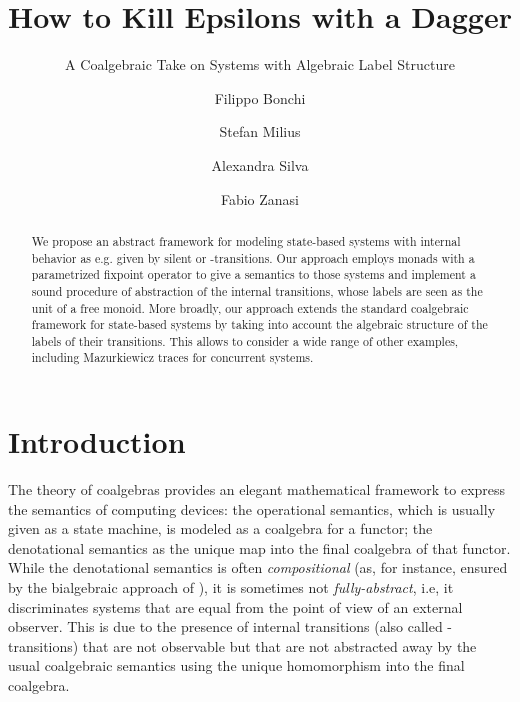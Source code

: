 \documentclass[oribibl,envcountsame,envcountsect,runningheads]{llncs}
\renewcommand{\>}{\rangle}
\begin{document}
\title{How to Kill Epsilons with a Dagger}
\subtitle{A Coalgebraic Take on Systems with Algebraic Label Structure}

\author{Filippo Bonchi \and Stefan Milius \and Alexandra Silva \and Fabio Zanasi }


\maketitle

\begin{abstract}
We propose an abstract framework for modeling state-based systems with internal behavior as e.g. given by silent or -transitions. Our approach employs monads with a parametrized fixpoint operator  to give a semantics to those systems and implement a sound procedure of abstraction of the internal transitions, whose labels are seen as the unit of a free monoid. More broadly, our approach extends the standard coalgebraic framework for state-based systems by taking into account the algebraic structure of the labels of their transitions. This allows to consider a wide range of other examples, including Mazurkiewicz traces for concurrent systems.
\end{abstract}

\section{Introduction}\label{Sec:Intro}
The theory of coalgebras provides an elegant mathematical framework to express the semantics of computing devices:
the operational semantics, which is usually given as a state machine, is modeled as a coalgebra for a functor; the denotational semantics as the unique map into the final coalgebra of that functor. While  the denotational semantics is often \emph{compositional} (as, for instance, ensured by the bialgebraic approach of \cite{plotkin-semop}), it is sometimes not \emph{fully-abstract}, i.e, it discriminates systems that are equal from the point of view of an external observer. This is due to the presence of internal transitions (also called -transitions) that are not observable but that are not abstracted away by the usual coalgebraic semantics using the unique homomorphism into the final coalgebra.
\end{document}
